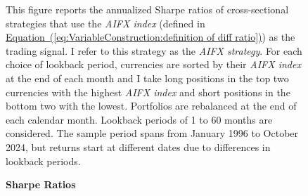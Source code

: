 \documentclass[12pt,oneside,letter]{article}
\newcommand*{\myeq}[1]{\hyperref[{#1}]{Equation~(\ref*{#1})}}
\begin{document}
%
\begin{landscape}
	
	\begin{figure}

    \begin{center}
    \caption{\bf Sharpe Ratios}
    \medskip
     \label{fig:Performance:sharpe ratio cs strategy diff}
    \end{center}


    \begin{small}
    This figure reports the annualized Sharpe ratios of cross-sectional strategies that use the \textit{AIFX index} (defined in \myeq{eq:VariableConstruction:definition of diff ratio}) as the trading signal. I refer to this strategy as the \textit{AIFX strategy}. For each choice of lookback period, currencies are sorted by their \textit{AIFX index} at the end of each month and I take long positions in the top two currencies with the highest \textit{AIFX index} and short positions in the bottom two with the lowest. Portfolios are rebalanced at the end of each calendar month. Lookback periods of 1 to 60 months are considered. The sample period spans from January 1996 to October 2024, but returns start at different dates due to differences in lookback periods.
    \end{small}


	\end{figure}

\end{landscape}
\end{document}
